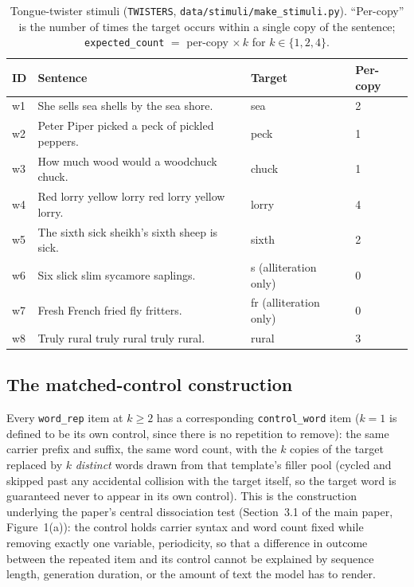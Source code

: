 \documentclass[11pt]{article}
\begin{document}
\begin{table}[h]
\centering
\caption{Tongue-twister stimuli (\texttt{TWISTERS},
\texttt{data/stimuli/make\_stimuli.py}). ``Per-copy'' is the number of times
the target occurs within a single copy of the sentence; \texttt{expected\_count}
$=$ per-copy $\times\, k$ for $k\in\{1,2,4\}$.}
\label{tab:twisters}
\small
\begin{tabular}{@{}lp{6.7cm}ll@{}}
\toprule
ID & Sentence & Target & Per-copy \\
\midrule
w1 & She sells sea shells by the sea shore. & sea & 2 \\
w2 & Peter Piper picked a peck of pickled peppers. & peck & 1 \\
w3 & How much wood would a woodchuck chuck. & chuck & 1 \\
w4 & Red lorry yellow lorry red lorry yellow lorry. & lorry & 4 \\
w5 & The sixth sick sheikh's sixth sheep is sick. & sixth & 2 \\
w6 & Six slick slim sycamore saplings. & s (alliteration only) & 0 \\
w7 & Fresh French fried fly fritters. & fr (alliteration only) & 0 \\
w8 & Truly rural truly rural truly rural. & rural & 3 \\
\bottomrule
\end{tabular}
\end{table}

\subsection{The matched-control construction}

Every \texttt{word\_rep} item at $k\ge 2$ has a corresponding
\texttt{control\_word} item ($k=1$ is defined to be its own control, since
there is no repetition to remove): the same carrier prefix and suffix, the
same word count, with the $k$ copies of the target replaced by $k$
\emph{distinct} words drawn from that template's filler pool (cycled and
skipped past any accidental collision with the target itself, so the target
word is guaranteed never to appear in its own control). This is the
construction underlying the paper's central dissociation test
(Section~3.1 of the main paper, Figure~1(a)): the control holds carrier
syntax and word count fixed while removing exactly one variable, periodicity,
so that a difference in outcome between the repeated item and its control
cannot be explained by sequence length, generation duration, or the amount of
text the model has to render.
\end{document}
